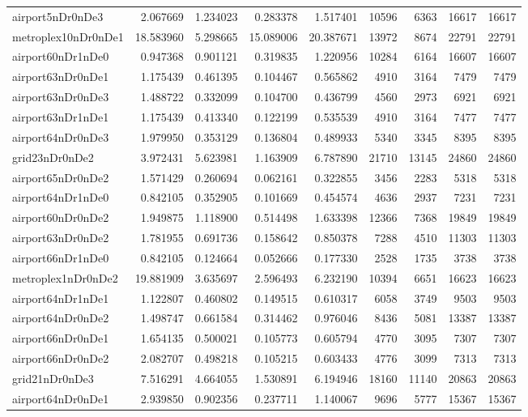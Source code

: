 \begin{longtable}{|l|r|r|r|r|r|r|r|r|}
airport5nDr0nDe3 & 2.067669 & 1.234023 & 0.283378 & 1.517401 & 10596 & 6363 & 16617 & 16617 \\
metroplex10nDr0nDe1 & 18.583960 & 5.298665 & 15.089006 & 20.387671 & 13972 & 8674 & 22791 & 22791 \\
airport60nDr1nDe0 & 0.947368 & 0.901121 & 0.319835 & 1.220956 & 10284 & 6164 & 16607 & 16607 \\
airport63nDr0nDe1 & 1.175439 & 0.461395 & 0.104467 & 0.565862 & 4910 & 3164 & 7479 & 7479 \\
airport63nDr0nDe3 & 1.488722 & 0.332099 & 0.104700 & 0.436799 & 4560 & 2973 & 6921 & 6921 \\
airport63nDr1nDe1 & 1.175439 & 0.413340 & 0.122199 & 0.535539 & 4910 & 3164 & 7477 & 7477 \\
airport64nDr0nDe3 & 1.979950 & 0.353129 & 0.136804 & 0.489933 & 5340 & 3345 & 8395 & 8395 \\
grid23nDr0nDe2 & 3.972431 & 5.623981 & 1.163909 & 6.787890 & 21710 & 13145 & 24860 & 24860 \\
airport65nDr0nDe2 & 1.571429 & 0.260694 & 0.062161 & 0.322855 & 3456 & 2283 & 5318 & 5318 \\
airport64nDr1nDe0 & 0.842105 & 0.352905 & 0.101669 & 0.454574 & 4636 & 2937 & 7231 & 7231 \\
airport60nDr0nDe2 & 1.949875 & 1.118900 & 0.514498 & 1.633398 & 12366 & 7368 & 19849 & 19849 \\
airport63nDr0nDe2 & 1.781955 & 0.691736 & 0.158642 & 0.850378 & 7288 & 4510 & 11303 & 11303 \\
airport66nDr1nDe0 & 0.842105 & 0.124664 & 0.052666 & 0.177330 & 2528 & 1735 & 3738 & 3738 \\
metroplex1nDr0nDe2 & 19.881909 & 3.635697 & 2.596493 & 6.232190 & 10394 & 6651 & 16623 & 16623 \\
airport64nDr1nDe1 & 1.122807 & 0.460802 & 0.149515 & 0.610317 & 6058 & 3749 & 9503 & 9503 \\
airport64nDr0nDe2 & 1.498747 & 0.661584 & 0.314462 & 0.976046 & 8436 & 5081 & 13387 & 13387 \\
airport66nDr0nDe1 & 1.654135 & 0.500021 & 0.105773 & 0.605794 & 4770 & 3095 & 7307 & 7307 \\
airport66nDr0nDe2 & 2.082707 & 0.498218 & 0.105215 & 0.603433 & 4776 & 3099 & 7313 & 7313 \\
grid21nDr0nDe3 & 7.516291 & 4.664055 & 1.530891 & 6.194946 & 18160 & 11140 & 20863 & 20863 \\
airport64nDr0nDe1 & 2.939850 & 0.902356 & 0.237711 & 1.140067 & 9696 & 5777 & 15367 & 15367 \\

\end{longtable}

